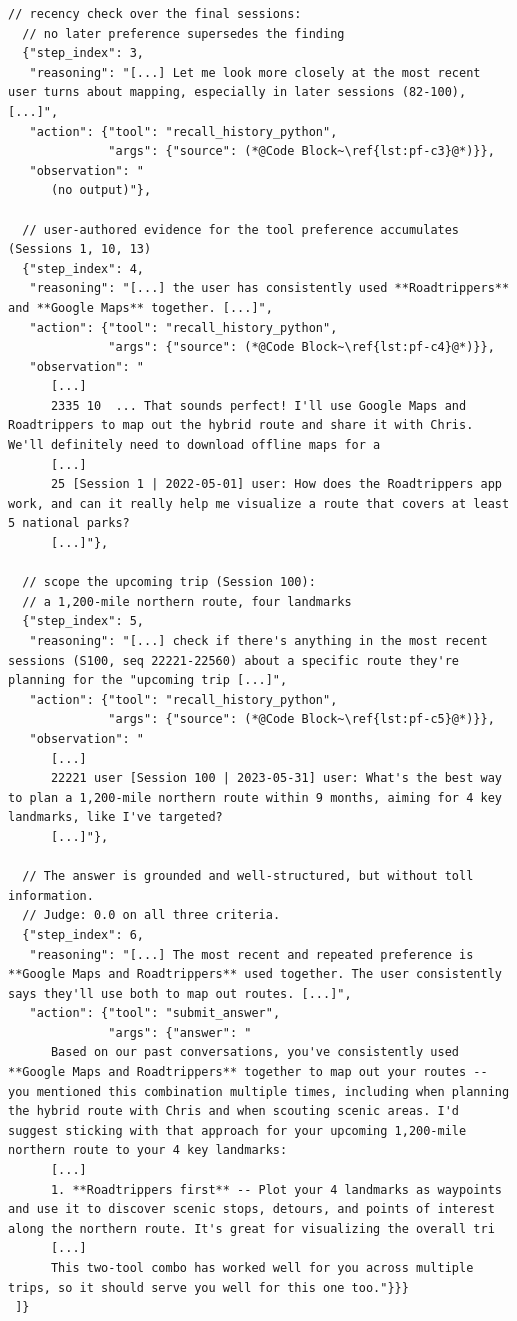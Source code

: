 \begin{lstlisting}[style=traj]
  // recency check over the final sessions: 
  // no later preference supersedes the finding
  {"step_index": 3,
   "reasoning": "[...] Let me look more closely at the most recent user turns about mapping, especially in later sessions (82-100), [...]",
   "action": {"tool": "recall_history_python",
              "args": {"source": (*@Code Block~\ref{lst:pf-c3}@*)}},
   "observation": "
      (no output)"},

  // user-authored evidence for the tool preference accumulates (Sessions 1, 10, 13)
  {"step_index": 4,
   "reasoning": "[...] the user has consistently used **Roadtrippers** and **Google Maps** together. [...]",
   "action": {"tool": "recall_history_python",
              "args": {"source": (*@Code Block~\ref{lst:pf-c4}@*)}},
   "observation": "
      [...]
      2335 10  ... That sounds perfect! I'll use Google Maps and Roadtrippers to map out the hybrid route and share it with Chris. We'll definitely need to download offline maps for a
      [...]
      25 [Session 1 | 2022-05-01] user: How does the Roadtrippers app work, and can it really help me visualize a route that covers at least 5 national parks?
      [...]"},

  // scope the upcoming trip (Session 100): 
  // a 1,200-mile northern route, four landmarks
  {"step_index": 5,
   "reasoning": "[...] check if there's anything in the most recent sessions (S100, seq 22221-22560) about a specific route they're planning for the "upcoming trip [...]",
   "action": {"tool": "recall_history_python",
              "args": {"source": (*@Code Block~\ref{lst:pf-c5}@*)}},
   "observation": "
      [...]
      22221 user [Session 100 | 2023-05-31] user: What's the best way to plan a 1,200-mile northern route within 9 months, aiming for 4 key landmarks, like I've targeted?
      [...]"},

  // The answer is grounded and well-structured, but without toll information. 
  // Judge: 0.0 on all three criteria.
  {"step_index": 6,
   "reasoning": "[...] The most recent and repeated preference is **Google Maps and Roadtrippers** used together. The user consistently says they'll use both to map out routes. [...]",
   "action": {"tool": "submit_answer",
              "args": {"answer": "
      Based on our past conversations, you've consistently used **Google Maps and Roadtrippers** together to map out your routes -- you mentioned this combination multiple times, including when planning the hybrid route with Chris and when scouting scenic areas. I'd suggest sticking with that approach for your upcoming 1,200-mile northern route to your 4 key landmarks:
      [...]
      1. **Roadtrippers first** -- Plot your 4 landmarks as waypoints and use it to discover scenic stops, detours, and points of interest along the northern route. It's great for visualizing the overall tri
      [...]
      This two-tool combo has worked well for you across multiple trips, so it should serve you well for this one too."}}}
 ]}
\end{lstlisting}

